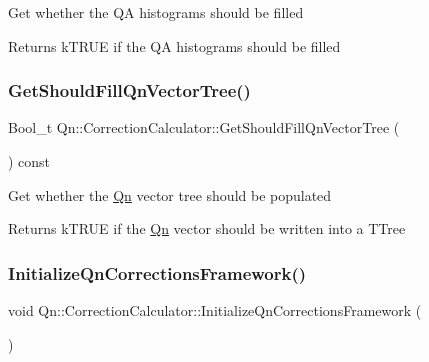 Get whether the QA histograms should be filled \begin{DoxyReturn}{Returns}
k\+T\+R\+UE if the QA histograms should be filled 
\end{DoxyReturn}
\mbox{\label{classQn_1_1CorrectionCalculator_aeb441a15ddd2c239a7f1d1fa1c9d5021}} 
\subsubsection{\texorpdfstring{Get\+Should\+Fill\+Qn\+Vector\+Tree()}{GetShouldFillQnVectorTree()}}
{\footnotesize\ttfamily Bool\+\_\+t Qn\+::\+Correction\+Calculator\+::\+Get\+Should\+Fill\+Qn\+Vector\+Tree (\begin{DoxyParamCaption}{ }\end{DoxyParamCaption}) const\hspace{0.3cm}{\ttfamily [inline]}}

Get whether the \mbox{\hyperlink{namespaceQn}{Qn}} vector tree should be populated \begin{DoxyReturn}{Returns}
k\+T\+R\+UE if the \mbox{\hyperlink{namespaceQn}{Qn}} vector should be written into a T\+Tree 
\end{DoxyReturn}
\mbox{\label{classQn_1_1CorrectionCalculator_ae3601c3eb23395888308b80a2017ac4e}} 
\subsubsection{\texorpdfstring{Initialize\+Qn\+Corrections\+Framework()}{InitializeQnCorrectionsFramework()}}
{\footnotesize\ttfamily void Qn\+::\+Correction\+Calculator\+::\+Initialize\+Qn\+Corrections\+Framework (\begin{DoxyParamCaption}{ }\end{DoxyParamCaption})}


